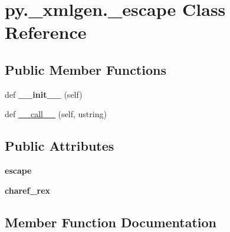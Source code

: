 \hypertarget{classpy_1_1__xmlgen_1_1__escape}{}\section{py.\+\_\+xmlgen.\+\_\+escape Class Reference}
\label{classpy_1_1__xmlgen_1_1__escape}
\subsection*{Public Member Functions}
\begin{DoxyCompactItemize}
\item 
\mbox{\label{classpy_1_1__xmlgen_1_1__escape_a34683721ce2ff1753486c6a2790f1fe9}} 
def {\bfseries \+\_\+\+\_\+init\+\_\+\+\_\+} (self)
\item 
def \hyperlink{classpy_1_1__xmlgen_1_1__escape_a0808ea66779f69796bcbe1218b4c9d2f}{\+\_\+\+\_\+call\+\_\+\+\_\+} (self, ustring)
\end{DoxyCompactItemize}
\subsection*{Public Attributes}
\begin{DoxyCompactItemize}
\item 
\mbox{\label{classpy_1_1__xmlgen_1_1__escape_aa09caafc95423d347703895c9aafd136}} 
{\bfseries escape}
\item 
\mbox{\label{classpy_1_1__xmlgen_1_1__escape_a12a112214a540663bf44d11d316e744b}} 
{\bfseries charef\+\_\+rex}
\end{DoxyCompactItemize}


\subsection{Member Function Documentation}
\mbox{\label{classpy_1_1__xmlgen_1_1__escape_a0808ea66779f69796bcbe1218b4c9d2f}} 
